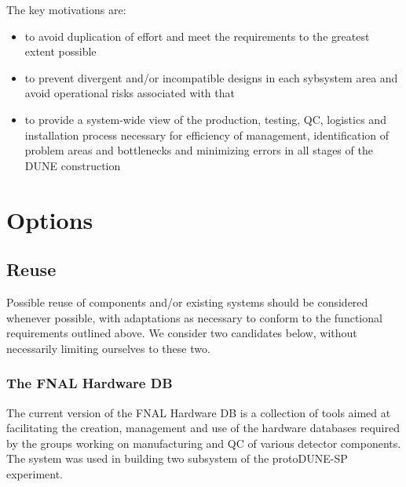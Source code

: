 \documentclass[pdftex,12pt,letter]{article}
\begin{document}
\noindent The key motivations are:

\begin{itemize}

\item to avoid duplication of effort and meet the requirements to the greatest extent possible

\item to prevent divergent and/or incompatible designs in each sybsystem area and avoid operational risks associated with that

\item to provide a system-wide view of the production, testing, QC, logistics and installation process necessary
for efficiency of management, identification of problem areas and bottlenecks and minimizing errors in all stages
of the DUNE construction

\end{itemize}


\section{Options}
\label{options}

\subsection{Reuse}
Possible reuse of components and/or existing systems should be considered whenever possible,
with adaptations as necessary to conform to the functional requirements outlined above. We consider
two candidates below, without necessarily limiting ourselves to these two.

\subsubsection{The FNAL Hardware DB}

The current version of the FNAL Hardware DB \cite{hardwareDB} is a collection of tools aimed at facilitating the creation,
management and use of the hardware databases required by the groups working on manufacturing and QC of 
various detector
components. The system was used in building two subsystem of the protoDUNE-SP experiment.
\end{document}
